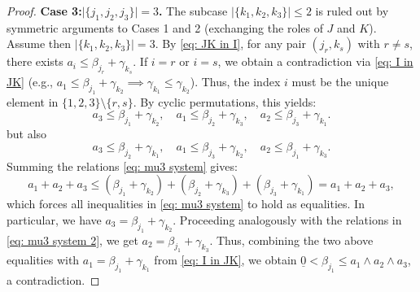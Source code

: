\documentclass[a4paper,10pt,reqno]{amsart}
\theoremstyle{definition}
\theoremstyle{definition}
\begin{document}
\begin{proof}
\medskip
\noindent\textbf{Case 3:$\lvert\{ j_1,j_2,j_3\}\rvert=3$.}
The subcase $\lvert\{k_1,k_2,k_3\}\rvert \le 2$ is ruled out by symmetric arguments to Cases 1 and 2 (exchanging the roles of $J$ and $K$). Assume then $\lvert\{k_1,k_2,k_3\}\rvert = 3$. By \ref{eq: JK in I}, for any pair $(j_r, k_s)$ with $r \neq s$, there exists $a_i \le \beta_{j_r} + \gamma_{k_s}$. If $i=r$ or $i=s$, we obtain a contradiction via \ref{eq: I in JK} (e.g., $a_1 \le \beta_{j_1}+\gamma_{k_2} \implies \gamma_{k_1} \le \gamma_{k_2}$). 
Thus, the index $i$ must be the unique element in $\{1,2,3\} \setminus \{r,s\}$. By cyclic permutations, this yields:
\begin{equation}\label{eq: mu3 system}
    a_3 \le \beta_{j_1}+\gamma_{k_2}, \quad a_1 \le \beta_{j_2}+\gamma_{k_3}, \quad a_2 \le \beta_{j_3}+\gamma_{k_1}.
\end{equation}
but also
\begin{equation}\label{eq: mu3 system 2}
    a_3 \le \beta_{j_2}+\gamma_{k_1}, \quad a_1 \le \beta_{j_3}+\gamma_{k_2}, \quad a_2 \le \beta_{j_1}+\gamma_{k_3}.
\end{equation}
Summing the relations \eqref{eq: mu3 system} gives:
\[
    a_1+a_2+a_3 \le (\beta_{j_1}+\gamma_{k_2}) + (\beta_{j_2}+\gamma_{k_3}) + (\beta_{j_3}+\gamma_{k_1}) = a_1+a_2+a_3,
\]
which forces all inequalities in \eqref{eq: mu3 system} to hold as equalities. In particular, we have $a_3 = \beta_{j_1}+\gamma_{k_2}$. Proceeding analogously with the relations in \eqref{eq: mu3 system 2}, we get $a_2 = \beta_{j_1}+\gamma_{k_3}$. Thus, combining the two above equalities with $a_1 = \beta_{j_1}+\gamma_{k_1}$ from \ref{eq: I in JK}, we obtain $\underline{0} < \beta_{j_1} \le a_1 \wedge a_2 \wedge a_3$, a contradiction.


\end{proof}
\end{document}
